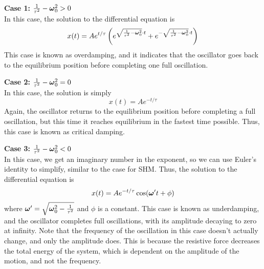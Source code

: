 \noindent \textbf{Case 1:} $\frac{1}{\tau^2} - \boldsymbol{\omega}_0^2 > 0$ \\
\noindent In this case, the solution to the differential equation is 
\begin{equation}
    x(t) = Ae^{t/\tau}\left( e^{\sqrt{\frac{1}{\tau^2} - \boldsymbol{\omega}_0^2}\cdot t} + e^{-\sqrt{\frac{1}{\tau^2} - \boldsymbol{\omega}_0^2}\cdot t} \right)
\end{equation}
\noindent This case is known as overdamping, and it indicates that the oscillator goes back to the equilibrium position before completing one full oscillation. 

\noindent \textbf{Case 2:} $\frac{1}{\tau^2} - \boldsymbol{\omega}_0^2 = 0$ \\
\noindent In this case, the solution is simply
\begin{equation}
    x(t) = Ae^{-t/\tau}
\end{equation}
\noindent Again, the oscillator returns to the equilibrium position before completing a full oscillation, but this time it reaches equilibrium in the fastest time possible. Thus, this case is known as critical damping.

\noindent \textbf{Case 3:} $\frac{1}{\tau^2} - \boldsymbol{\omega}_0^2 < 0$ \\
\noindent In this case, we get an imaginary number in the exponent, so we can use Euler's identity to simplify, similar to the case for SHM. Thus, the solution to the differential equation is 
\begin{equation}
    x(t) = Ae^{-t/\tau}\cos(\boldsymbol{\omega}' t + \phi)
\end{equation}
\noindent where $\boldsymbol{\omega}' = \sqrt{\boldsymbol{\omega}_0^2 - \frac{1}{\tau^2}}$ and $\phi$ is a constant. This case is known as underdamping, and the oscillator completes full oscillations, with its amplitude decaying to zero at infinity. Note that the frequency of the oscillation in this case doesn't actually change, and only the amplitude does. This is because the resistive force decreases the total energy of the system, which is dependent on the amplitude of the motion, and not the frequency.

